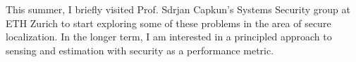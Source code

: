 \documentclass[10pt]{article}
\begin{document}
This summer, I briefly visited Prof. Sdrjan Capkun's Systems Security group at ETH Zurich to start exploring some of these problems in the area of secure localization. In the longer term, I am interested in a principled approach to sensing and estimation with security as a performance metric. %

\end{document}
